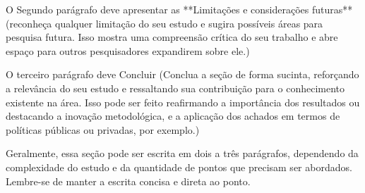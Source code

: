 \documentclass[a4paper]{article}
\begin{document}
O Segundo parágrafo deve apresentar as **Limitações e considerações futuras** (reconheça qualquer limitação do seu estudo e sugira possíveis áreas para pesquisa futura. Isso mostra uma compreensão crítica do seu trabalho e abre espaço para outros pesquisadores expandirem sobre ele.)

O terceiro parágrafo deve Concluir (Conclua a seção de forma sucinta, reforçando a relevância do seu estudo e ressaltando sua contribuição para o conhecimento existente na área. Isso pode ser feito reafirmando a importância dos resultados ou destacando a inovação metodológica, e a aplicação dos achados em termos de políticas públicas ou privadas, por exemplo.)

Geralmente, essa seção pode ser escrita em dois a três parágrafos, dependendo da complexidade do estudo e da quantidade de pontos que precisam ser abordados. Lembre-se de manter a escrita concisa e direta ao ponto.

\newpage



\end{document}
